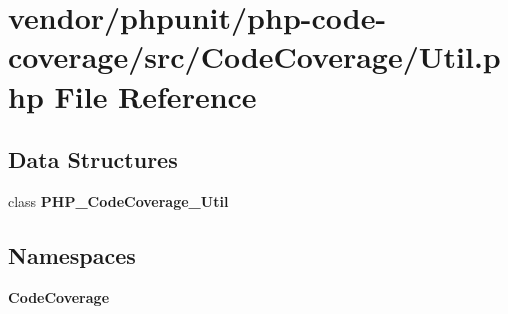 \section{vendor/phpunit/php-\/code-\/coverage/src/\+Code\+Coverage/\+Util.php File Reference}
\label{phpunit_2php-code-coverage_2src_2_code_coverage_2_util_8php}
\subsection*{Data Structures}
\begin{DoxyCompactItemize}
\item 
class {\bf P\+H\+P\+\_\+\+Code\+Coverage\+\_\+\+Util}
\end{DoxyCompactItemize}
\subsection*{Namespaces}
\begin{DoxyCompactItemize}
\item 
 {\bf Code\+Coverage}
\end{DoxyCompactItemize}
